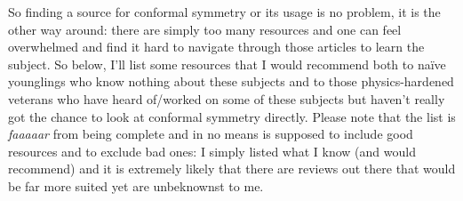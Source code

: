 \documentclass[12pt]{article}
\numberwithin{equation}{section}
\def\naive{naïve }
\begin{document}
So finding a source for conformal symmetry or its usage is no problem, it is the other way around: there are simply too many resources and one can feel overwhelmed and find it hard to navigate through those articles to learn the subject. So below, I'll list some resources that I would recommend both to \naive younglings who know nothing about these subjects and to those physics-hardened veterans who have heard of/worked on some of these subjects but haven't really got the chance to look at conformal symmetry directly. Please note that the list is \emph{faaaaar} from being complete and in no means is supposed to include good resources and to exclude bad ones: I simply listed what I know (and would recommend) and it is extremely likely that there are reviews out there that would be far more suited yet are unbeknownst to me.
\end{document}
